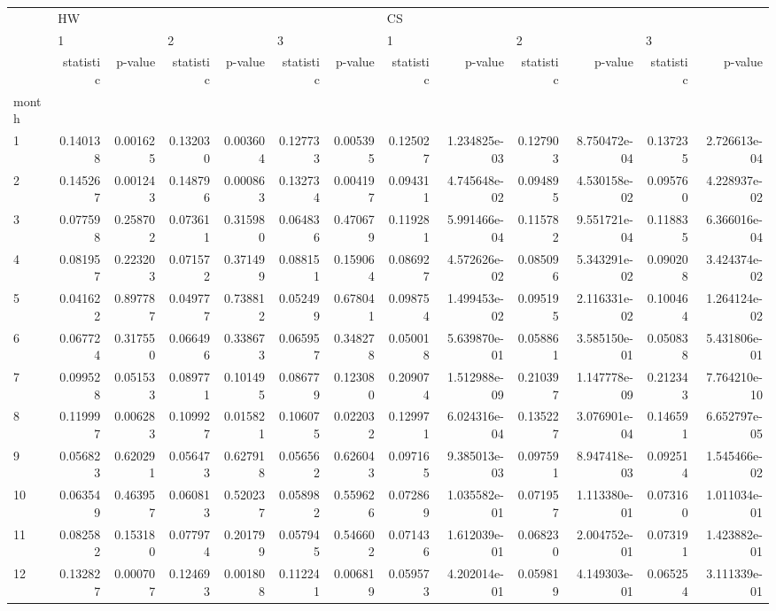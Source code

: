 \begin{tabular}{lrrrrrrrrrrrr}
\toprule
{} & \multicolumn{6}{l}{HW} & \multicolumn{6}{l}{CS} \\
{} & \multicolumn{2}{l}{1} & \multicolumn{2}{l}{2} & \multicolumn{2}{l}{3} & \multicolumn{2}{l}{1} & \multicolumn{2}{l}{2} & \multicolumn{2}{l}{3} \\
{} & statistic &   p-value & statistic &   p-value & statistic &   p-value & statistic &       p-value & statistic &       p-value & statistic &       p-value \\
month &           &           &           &           &           &           &           &               &           &               &           &               \\
\midrule
1     &  0.140138 &  0.001625 &  0.132030 &  0.003604 &  0.127733 &  0.005395 &  0.125027 &  1.234825e-03 &  0.127903 &  8.750472e-04 &  0.137235 &  2.726613e-04 \\
2     &  0.145267 &  0.001243 &  0.148796 &  0.000863 &  0.132734 &  0.004197 &  0.094311 &  4.745648e-02 &  0.094895 &  4.530158e-02 &  0.095760 &  4.228937e-02 \\
3     &  0.077598 &  0.258702 &  0.073611 &  0.315980 &  0.064836 &  0.470679 &  0.119281 &  5.991466e-04 &  0.115782 &  9.551721e-04 &  0.118835 &  6.366016e-04 \\
4     &  0.081957 &  0.223203 &  0.071572 &  0.371499 &  0.088151 &  0.159064 &  0.086927 &  4.572626e-02 &  0.085096 &  5.343291e-02 &  0.090208 &  3.424374e-02 \\
5     &  0.041622 &  0.897787 &  0.049777 &  0.738812 &  0.052499 &  0.678041 &  0.098754 &  1.499453e-02 &  0.095195 &  2.116331e-02 &  0.100464 &  1.264124e-02 \\
6     &  0.067724 &  0.317550 &  0.066496 &  0.338673 &  0.065957 &  0.348278 &  0.050018 &  5.639870e-01 &  0.058861 &  3.585150e-01 &  0.050838 &  5.431806e-01 \\
7     &  0.099528 &  0.051533 &  0.089771 &  0.101495 &  0.086779 &  0.123080 &  0.209074 &  1.512988e-09 &  0.210397 &  1.147778e-09 &  0.212343 &  7.764210e-10 \\
8     &  0.119997 &  0.006283 &  0.109927 &  0.015821 &  0.106075 &  0.022032 &  0.129971 &  6.024316e-04 &  0.135227 &  3.076901e-04 &  0.146591 &  6.652797e-05 \\
9     &  0.056823 &  0.620291 &  0.056473 &  0.627918 &  0.056562 &  0.626043 &  0.097165 &  9.385013e-03 &  0.097591 &  8.947418e-03 &  0.092514 &  1.545466e-02 \\
10    &  0.063549 &  0.463957 &  0.060813 &  0.520237 &  0.058982 &  0.559626 &  0.072869 &  1.035582e-01 &  0.071957 &  1.113380e-01 &  0.073160 &  1.011034e-01 \\
11    &  0.082582 &  0.153180 &  0.077974 &  0.201799 &  0.057945 &  0.546602 &  0.071436 &  1.612039e-01 &  0.068230 &  2.004752e-01 &  0.073191 &  1.423882e-01 \\
12    &  0.132827 &  0.000707 &  0.124693 &  0.001808 &  0.112241 &  0.006819 &  0.059573 &  4.202014e-01 &  0.059819 &  4.149303e-01 &  0.065254 &  3.111339e-01 \\
\bottomrule
\end{tabular}
